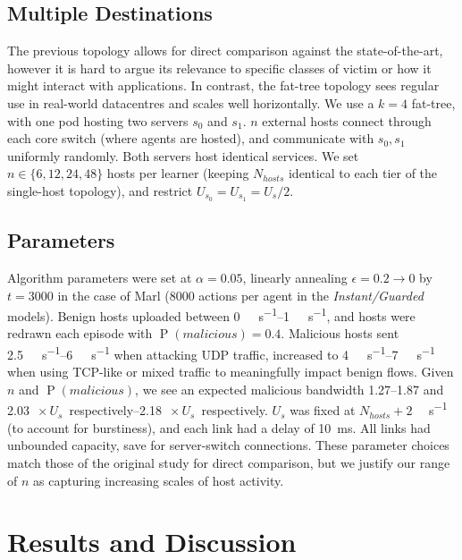 \documentclass[10pt, times, conference, letterpaper]{IEEEtran}
\begin{document}
\subsection{Multiple Destinations}
The previous topology allows for direct comparison against the state-of-the-art, however it is hard to argue its relevance to specific classes of victim or how it might interact with applications.
In contrast, the fat-tree topology \cite{DBLP:conf/sigcomm/Al-FaresLV08} sees regular use in real-world datacentres and scales well horizontally.
We use a $k=4$ fat-tree, with one pod hosting two servers $s_0$ and $s_1$.
$n$ external hosts connect through each core switch (where agents are hosted), and communicate with $s_0, s_1$ uniformly randomly.
Both servers host identical services.
We set $n \in \{6, 12, 24, 48\}$ hosts per learner (keeping $N_{\mathit{hosts}}$ identical to each tier of the single-host topology), and restrict $U_{s_0} = U_{s_1} = U_s / 2$.

\subsection{Parameters}
Algorithm parameters were set at $\alpha=0.05$, linearly annealing $\epsilon=0.2 \rightarrow 0$ by $t=3000$ in the case of Marl (\num{8000} actions per agent in the \emph{Instant/Guarded} models).
Benign hosts uploaded between \SIrange{0}{1}{\mega\bit\per\second}, and hosts were redrawn each episode with $\operatorname{P}(\mathit{malicious})=0.4$.
Malicious hosts sent \SIrange{2.5}{6}{\mega\bit\per\second} when attacking UDP traffic, increased to \SIrange{4}{7}{\mega\bit\per\second} when using TCP-like or mixed traffic to meaningfully impact benign flows.
Given $n$ and $\operatorname{P}(\mathit{malicious})$, we see an expected malicious bandwidth \numrange{1.27}{1.87} and \SIrange{2.03}{2.18}{$\! \times U_s$} respectively.
$U_s$ was fixed at $N_{\mathit{hosts}}+2$ \si{\mega\bit\per\second} (to account for burstiness), and each link had a delay of \SI{10}{\milli\second}.
All links had unbounded capacity, save for server-switch connections.
These parameter choices match those of the original study for direct comparison, but we justify our range of $n$ as capturing increasing scales of host activity.

\section{Results and Discussion}
\label{sec:the-results-of-doing-so}
\end{document}

